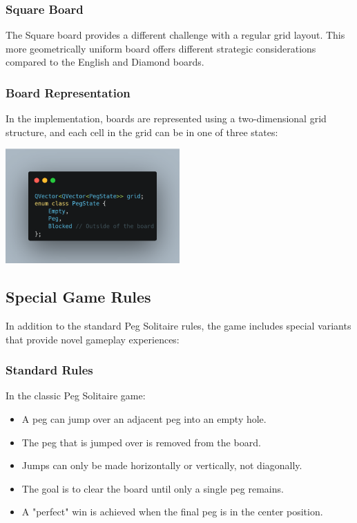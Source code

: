 \subsubsection{Square Board}
The Square board provides a different challenge with a regular grid layout. This more geometrically uniform board offers different strategic considerations compared to the English and Diamond boards.

\subsubsection{Board Representation}
In the implementation, boards are represented using a two-dimensional grid structure,
and each cell in the grid can be in one of three states:

\begin{center}
    \includegraphics[width=0.5\textwidth]{resource/code-examples/BoardRepresentation.png}
\end{center}

\subsection{Special Game Rules}
In addition to the standard Peg Solitaire rules, the game includes special variants that provide novel gameplay experiences:

\subsubsection{Standard Rules}
In the classic Peg Solitaire game:
\begin{itemize}
    \item A peg can jump over an adjacent peg into an empty hole.
    \item The peg that is jumped over is removed from the board.
    \item Jumps can only be made horizontally or vertically, not diagonally.
    \item The goal is to clear the board until only a single peg remains.
    \item A "perfect" win is achieved when the final peg is in the center position.
\end{itemize}

